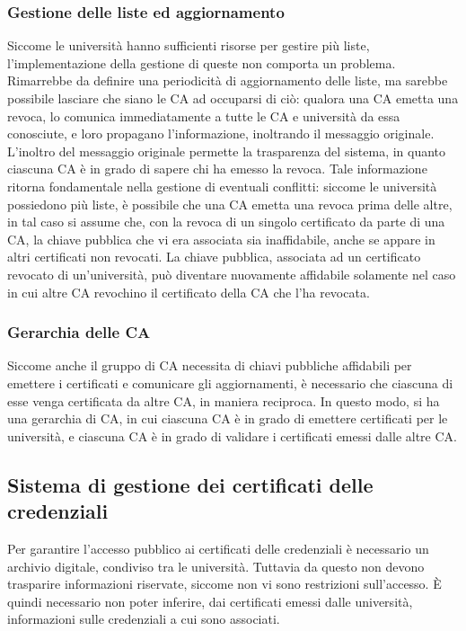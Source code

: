 \documentclass[a4paper,12pt]{article}
\begin{document}
\subsubsection{Gestione delle liste ed aggiornamento} Siccome le università hanno sufficienti risorse per gestire più liste, l'implementazione della gestione di queste non comporta un problema. Rimarrebbe da definire una periodicità di aggiornamento delle liste, ma sarebbe possibile lasciare che siano le CA ad occuparsi di ciò: qualora una CA emetta una revoca, lo comunica immediatamente a tutte le CA e università da essa conosciute, e loro propagano l'informazione, inoltrando il messaggio originale.
\newline L'inoltro del messaggio originale permette la trasparenza del sistema, in quanto ciascuna CA è in grado di sapere chi ha emesso la revoca. Tale informazione ritorna fondamentale nella gestione di eventuali conflitti: siccome le università possiedono più liste, è possibile che una CA emetta una revoca prima delle altre, in tal caso si assume che, con la revoca di un singolo certificato da parte di una CA, la chiave pubblica che vi era associata sia inaffidabile, anche se appare in altri certificati non revocati. La chiave pubblica, associata ad un certificato revocato di un'università, può diventare nuovamente affidabile solamente nel caso in cui altre CA revochino il certificato della CA che l'ha revocata.
\subsubsection{Gerarchia delle CA} Siccome anche il gruppo di CA necessita di chiavi pubbliche affidabili per emettere i certificati e comunicare gli aggiornamenti, è necessario che ciascuna di esse venga certificata da altre CA, in maniera reciproca. In questo modo, si ha una gerarchia di CA, in cui ciascuna CA è in grado di emettere certificati per le università, e ciascuna CA è in grado di validare i certificati emessi dalle altre CA.

\subsection{Sistema di gestione dei certificati delle credenziali}
Per garantire l'accesso pubblico ai certificati delle credenziali è necessario un archivio digitale, condiviso tra le università. Tuttavia da questo non devono trasparire informazioni riservate, siccome non vi sono restrizioni sull'accesso. È quindi necessario non poter inferire, dai certificati emessi dalle università, informazioni sulle credenziali a cui sono associati.
\end{document}
